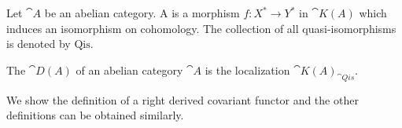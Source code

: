 \begin{center}
\end{center}
\begin{definition}
    Let $\cat{A}$ be an abelian category. A  is a morphism $f:{X}^{*}\to{Y}^{*}$ in $\cat{K(A)}$ which induces an isomorphism on cohomology. The collection of all quasi-isomorphisms is denoted by $\text{Qis}$.
\end{definition}
\begin{definition}
    The  $\cat{D(A)}$ of an abelian category $\cat{A}$ is the localization ${\cat{K(A)}}_{\cat{Qis}}$.
\end{definition}
\par
We show the definition of a right derived covariant functor and the other definitions can be obtained similarly.
